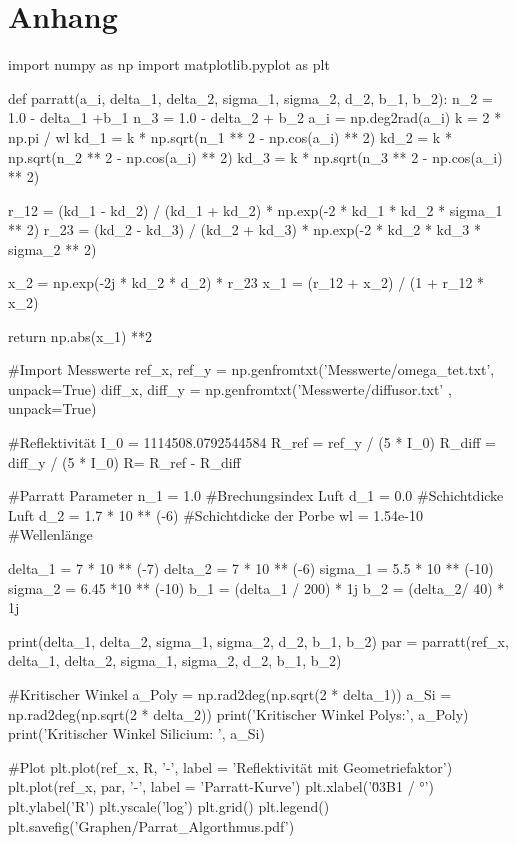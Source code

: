 \section{Anhang}

\begin{python}
    import numpy as np
    import matplotlib.pyplot as plt

    def parratt(a_i, delta_1, delta_2, sigma_1, sigma_2, d_2, b_1, b_2):
        n_2 = 1.0 - delta_1 +b_1
        n_3 = 1.0 - delta_2 + b_2
        a_i = np.deg2rad(a_i)
        k = 2 * np.pi / wl
        kd_1 = k * np.sqrt(n_1 ** 2 - np.cos(a_i) ** 2)
        kd_2 = k * np.sqrt(n_2 ** 2 - np.cos(a_i) ** 2)
        kd_3 = k * np.sqrt(n_3 ** 2 - np.cos(a_i) ** 2)
        
        r_12 = (kd_1 - kd_2) / (kd_1 + kd_2) * np.exp(-2 * kd_1 * kd_2 * sigma_1 ** 2)
        r_23 = (kd_2 - kd_3) / (kd_2 + kd_3) * np.exp(-2 * kd_2 * kd_3 * sigma_2 ** 2)

        x_2 = np.exp(-2j * kd_2 * d_2) * r_23
        x_1 = (r_12 + x_2) / (1 + r_12 * x_2)

        return np.abs(x_1) **2

    #Import Messwerte
    ref_x, ref_y = np.genfromtxt('Messwerte/omega_tet.txt', unpack=True)
    diff_x, diff_y = np.genfromtxt('Messwerte/diffusor.txt' , unpack=True)

    #Reflektivität
    I_0 = 1114508.0792544584
    R_ref = ref_y / (5 * I_0)
    R_diff = diff_y / (5 * I_0)
    R= R_ref - R_diff

    #Parratt Parameter
    n_1 = 1.0               #Brechungsindex Luft
    d_1 = 0.0               #Schichtdicke Luft
    d_2 = 1.7 * 10 ** (-6) #Schichtdicke der Porbe
    wl = 1.54e-10           #Wellenlänge

    delta_1 = 7 * 10 ** (-7)
    delta_2 = 7 * 10 ** (-6)
    sigma_1 = 5.5 * 10 ** (-10) 
    sigma_2 = 6.45 *10 ** (-10)
    b_1 = (delta_1 / 200) * 1j
    b_2 = (delta_2/ 40) * 1j


    print(delta_1, delta_2, sigma_1, sigma_2, d_2, b_1, b_2)
    par = parratt(ref_x, delta_1, delta_2, sigma_1, sigma_2, d_2, b_1, b_2)


    #Kritischer Winkel
    a_Poly = np.rad2deg(np.sqrt(2 * delta_1))
    a_Si = np.rad2deg(np.sqrt(2 * delta_2))
    print('Kritischer Winkel Polys:', a_Poly)
    print('Kritischer Winkel Silicium: ', a_Si)

    #Plot
    plt.plot(ref_x, R, '-', label = 'Reflektivität mit Geometriefaktor')
    plt.plot(ref_x, par, '-', label = 'Parratt-Kurve')
    plt.xlabel('\u03B1 / °')
    plt.ylabel('R')
    plt.yscale('log')
    plt.grid()
    plt.legend()
    plt.savefig('Graphen/Parrat_Algorthmus.pdf')
\end{python}
